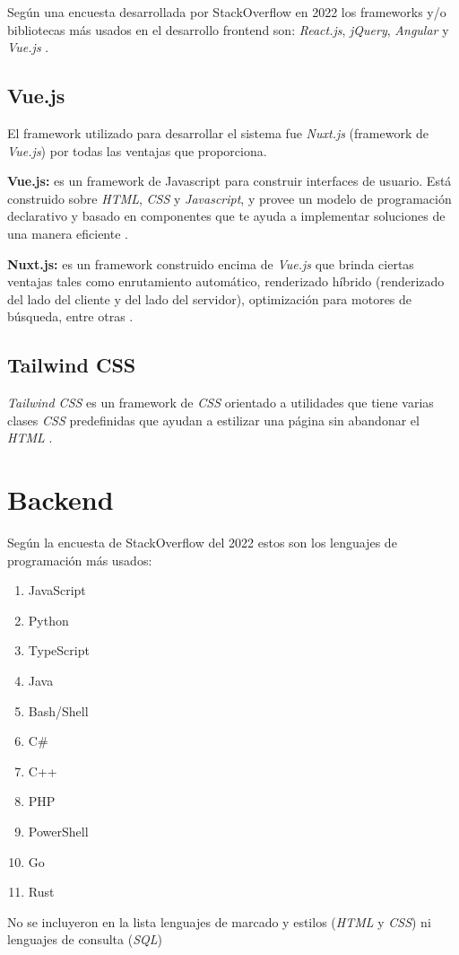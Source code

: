 Según una encuesta desarrollada por StackOverflow en 2022 los frameworks y/o bibliotecas más usados en el desarrollo frontend son: \textit{React.js}, \textit{jQuery}, \textit{Angular} y \textit{Vue.js} \cite{encuesta2022}.

\subsection{Vue.js}
El framework utilizado para desarrollar el sistema fue \textit{Nuxt.js} (framework de \textit{Vue.js}) por todas las ventajas que proporciona.
\newline

\textbf{Vue.js:} es un framework de Javascript para construir interfaces de usuario. Está construido sobre \textit{HTML}, \textit{CSS} y \textit{Javascript}, y provee un modelo de programación declarativo y basado en componentes que te ayuda a implementar soluciones de una manera eficiente \cite{vue}.
\newline

\textbf{Nuxt.js:} es un framework construido encima de \textit{Vue.js} que brinda ciertas ventajas tales como enrutamiento automático, renderizado híbrido (renderizado del lado del cliente y del lado del servidor), optimización para motores de búsqueda, entre otras \cite{nuxt}.

\subsection{Tailwind CSS}
\textit{Tailwind CSS} es un framework de \textit{CSS} orientado a utilidades que tiene varias clases \textit{CSS} predefinidas que ayudan a estilizar una página sin abandonar el \textit{HTML} \cite{tailwind}.

\section{Backend}
Según la encuesta de StackOverflow del 2022 \cite{encuesta2022} estos son los lenguajes de programación más usados: 
\begin{enumerate}
	\item JavaScript
	\item Python
	\item TypeScript
	\item Java
	\item Bash/Shell
	\item C\#
	\item C++
	\item PHP
	\item PowerShell
	\item Go
	\item Rust
\end{enumerate}
No se incluyeron en la lista lenguajes de marcado y estilos (\textit{HTML} y \textit{CSS}) ni lenguajes de consulta (\textit{SQL})
\newline

